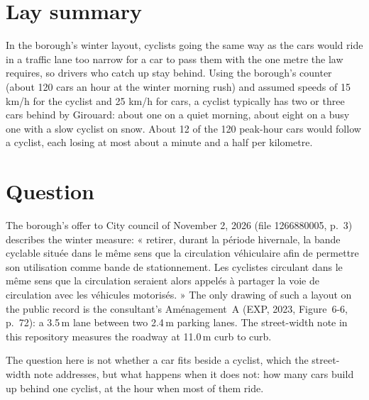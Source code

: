 \documentclass[11pt,a4paper]{article}
\begin{document}
\section*{Lay summary}
In the borough\textquoteright{}s winter layout, cyclists going the same way as the cars would ride in a traffic lane too narrow for a car to pass them with the one metre the law requires, so drivers who catch up stay behind. Using the borough\textquoteright{}s counter (about 120 cars an hour at the winter morning rush) and assumed speeds of 15 km/h for the cyclist and 25 km/h for cars, a cyclist typically has two or three cars behind by Girouard: about one on a quiet morning, about eight on a busy one with a slow cyclist on snow. About 12 of the 120 peak-hour cars would follow a cyclist, each losing at most about a minute and a half per kilometre.

\tableofcontents

\section{Question}
The borough\textquoteright{}s offer to City council of November 2, 2026 (file 1266880005, p.~3) describes the winter measure: « retirer, durant la période hivernale, la bande cyclable située dans le même sens que la circulation véhiculaire afin de permettre son utilisation comme bande de stationnement. Les cyclistes circulant dans le même sens que la circulation seraient alors appelés à partager la voie de circulation avec les véhicules motorisés. » The only drawing of such a layout on the public record is the consultant\textquoteright{}s Aménagement~A (EXP, 2023, Figure~6-6, p.~72): a 3.5\,m lane between two 2.4\,m parking lanes. The street-width note in this repository measures the roadway at 11.0\,m curb to curb.

The question here is not whether a car fits beside a cyclist, which the street-width note addresses, but what happens when it does not: how many cars build up behind one cyclist, at the hour when most of them ride.
\end{document}
